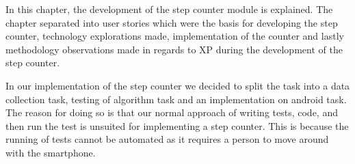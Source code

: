 In this chapter, the development of the step counter module is explained. The chapter separated into user stories which were the basis for developing the step counter, technology explorations made, implementation of the counter and lastly methodology observations made in regards to XP during the development of the step counter. 

In our implementation of the step counter we decided to split the task into a data collection task, testing of algorithm task and an implementation on android task. The reason for doing so is that our normal approach of writing tests, code, and then run the test is unsuited for implementing a step counter. This is because the running of tests cannot be automated as it requires a person to move around with the smartphone.